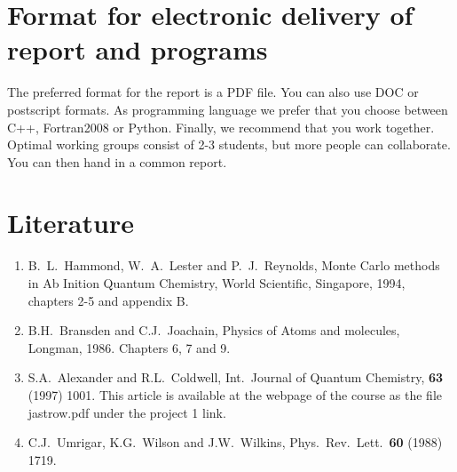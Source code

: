 \documentclass[10pt]{article}
\begin{document}
\section*{Format for electronic delivery of report and programs}
%
The preferred format for the report is a PDF file. You can also
use DOC or postscript formats. 
As programming language we prefer that you choose between C++, Fortran2008 or Python.
Finally, 
we recommend that you work together. Optimal working groups consist of 
2-3 students, but more people can collaborate. You can then hand in a common report. 





\section*{Literature}
\begin{enumerate}
\item B.~L.~Hammond, W.~A.~Lester and P.~J.~Reynolds, Monte Carlo methods
in Ab Inition Quantum Chemistry, World Scientific, Singapore, 1994, chapters
2-5 and appendix B.

\item B.H.~Bransden and C.J.~Joachain, Physics of Atoms and molecules,
Longman, 1986. Chapters 6, 7 and 9.
\item S.A.~Alexander and R.L.~Coldwell,
Int.~Journal of Quantum Chemistry, {\bf 63} (1997) 1001.  This article is available 
at the webpage of the course as the file jastrow.pdf under the project 1 link.
\item C.J.~Umrigar, K.G.~Wilson and J.W.~Wilkins, Phys.~Rev.~Lett.~{\bf 60}
(1988) 1719. 



\end{enumerate}
\end{document}
